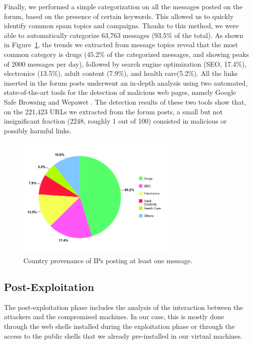 Finally, we performed a simple categorization on all the messages posted on the forum, based on the presence of certain keywords. This allowed us to quickly identify common spam topics and campaigns. Thanks to this method, we were able to automatically categorize 63,763 messages (93.5\% of the total).
As shown in Figure~\ref{fig:SpamCategory}, the trends we extracted from message topics reveal that the most common category is drugs (45.2\% of the categorized messages, and showing peaks of 2000 messages per day), followed by search engine optimization (SEO, 17.4\%), electronics (13.5\%), adult content (7.9\%), and health care(5.2\%).
All the links inserted in the forum posts underwent an in-depth analysis using two automated, state-of-the-art tools for the detection of malicious web pages, namely Google Safe Browsing \cite{googleSafeBrowsing} and Wepawet \cite{wepaWet}. The detection results of these two tools show that, on the 221,423 URLs we extracted from the forum posts, a small but not insignificant fraction (2248, roughly 1 out of 100) consisted in malicious or possibly harmful links.

\begin{figure}[tbh]
\centerline{\includegraphics[width=0.7\textwidth]{Images/SpamCategory.png}}
\caption{Country provenance of IPs posting at least one message.\label{fig:SpamCategory}}
\end{figure}

\subsection{Post-Exploitation}

The post-exploitation phase includes the analysis of the interaction between the attackers and the compromised machines. In our case, this is mostly done through the web shells installed during the exploitation phase or through the access to the public shells that we already pre-installed in our virtual machines.


